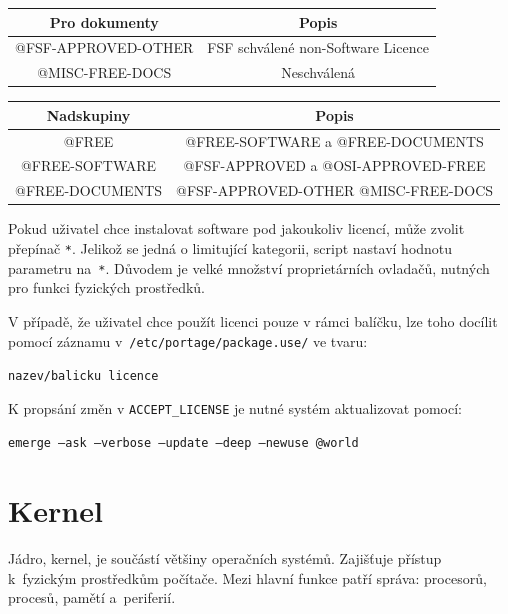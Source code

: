\documentclass[12pt,a4paper,twoside,]{article}
\begin{document}
{{{{{{{\begin{table}[h]
\begin{tabular}{|c|c|c|}
	\end{tabular}
\end{table}
\begin{table}[h]
	\centering
	\begin{tabular}{|c|c|}
		\hline
		Pro dokumenty & Popis \\
		\hline
		@FSF-APPROVED-OTHER & FSF schválené non-Software Licence \\
		\hline
		@MISC-FREE-DOCS & Neschválená \\
		\hline
	\end{tabular}
\end{table}
\begin{table}[h]
	\centering
	\begin{tabular}{|c|c|}
	\hline
	Nadskupiny & Popis \\
	\hline
	@FREE & @FREE-SOFTWARE a @FREE-DOCUMENTS \\
	\hline
	@FREE-SOFTWARE & @FSF-APPROVED a @OSI-APPROVED-FREE\\
	\hline
	@FREE-DOCUMENTS & @FSF-APPROVED-OTHER @MISC-FREE-DOCS\\
	\hline
	\end{tabular}
\end{table}
\hspace{-1.5em}Pokud uživatel chce instalovat software pod jakoukoliv licencí, může zvolit přepínač \texttt{*}.
Jelikož se jedná o limitující kategorii, script nastaví hodnotu parametru na~\texttt{*}. Důvodem je velké množství proprietárních ovladačů, nutných pro funkci fyzických prostředků.


\hspace*{-1.5em}V případě, že uživatel chce použít licenci pouze v rámci balíčku, lze toho docílit pomocí záznamu v~\texttt{/etc/portage/package.use/} ve tvaru:

\texttt{nazev/balicku licence}

\hspace{-1.5em}K propsání změn v \texttt{ACCEPT\_LICENSE} je nutné systém aktualizovat pomocí:

\texttt{emerge --ask --verbose --update --deep --newuse @world}


\newpage

\section{\textsf{Kernel}}\hypertarget{Kernel}{}
Jádro, kernel, je součástí většiny operačních systémů. Zajišťuje přístup k~fyzickým prostředkům počítače. Mezi hlavní funkce patří správa: procesorů, procesů, pamětí a~periferií. 

}}}}}}}
\end{document}

